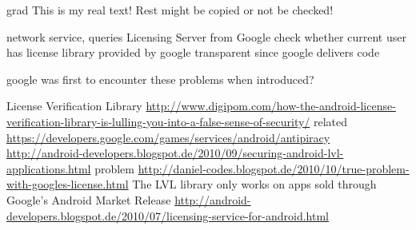 grad%
This is my real text! Rest might be copied or not be checked!

%
network service, queries Licensing Server from Google
check whether current user has license
library provided by google
transparent since google delivers code

\cite{munteanLicensing}
%


google was first to encounter these problems
when introduced?

License Verification Library\newline
\url{http://www.digipom.com/how-the-android-license-verification-library-is-lulling-you-into-a-false-sense-of-security/}\newline
related \url{https://developers.google.com/games/services/android/antipiracy}\newline
\url{http://android-developers.blogspot.de/2010/09/securing-android-lvl-applications.html}\newline
problem \url{http://daniel-codes.blogspot.de/2010/10/true-problem-with-googles-license.html}\newline
The LVL library only works on apps sold through Google's Android Market
Release \url{http://android-developers.blogspot.de/2010/07/licensing-service-for-android.html}
